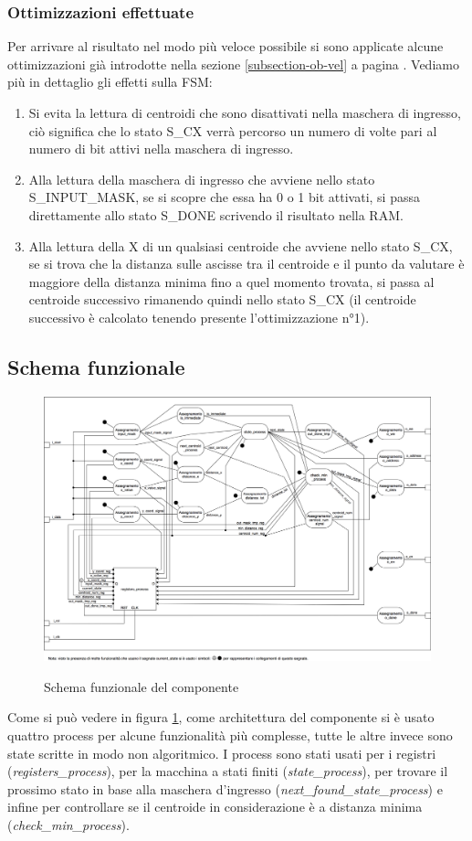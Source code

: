 \documentclass{article}
\begin{document}
\subsubsection{Ottimizzazioni effettuate}
Per arrivare al risultato nel modo più veloce possibile si sono applicate alcune ottimizzazioni già introdotte nella sezione \ref{subsection-ob-vel} a pagina \pageref{subsection-ob-vel}. Vediamo più in dettaglio gli effetti sulla FSM:
\begin{enumerate}
  \item Si evita la lettura di centroidi che sono disattivati nella maschera di ingresso, ciò significa che lo stato S\_CX verrà percorso un numero di volte pari al numero di bit attivi nella maschera di ingresso. 
  \item Alla lettura della maschera di ingresso che avviene nello stato S\_INPUT\_MASK, se si scopre che essa ha 0 o 1 bit attivati, si passa direttamente allo stato S\_DONE scrivendo il risultato nella RAM.
  \item Alla lettura della X di un qualsiasi centroide che avviene nello stato S\_CX, se si trova che la distanza sulle ascisse tra il centroide e il punto da valutare è maggiore della distanza minima fino a quel momento trovata, si passa al centroide successivo rimanendo quindi nello stato S\_CX (il centroide successivo è calcolato tenendo presente l'ottimizzazione n°1).
\end{enumerate}

\subsection{Schema funzionale}
\begin{figure}[H]
\centering
\caption{Schema funzionale del componente}
\includegraphics[width=1.0\textwidth]{Schema.png}
\label{fig:Schema}
\end{figure}
Come si può vedere in figura \ref{fig:Schema}, come architettura del componente si è usato quattro process per alcune funzionalità più complesse, tutte le altre invece sono state scritte in modo non algoritmico.
I process sono stati usati per i registri (\textit{registers\_process}), per la macchina a stati finiti (\textit{state\_process}), per trovare il prossimo stato in base alla maschera d'ingresso (\textit{next\_found\_state\_process}) e infine per controllare se il centroide in considerazione è a distanza minima (\textit{check\_min\_process}).
\end{document}
